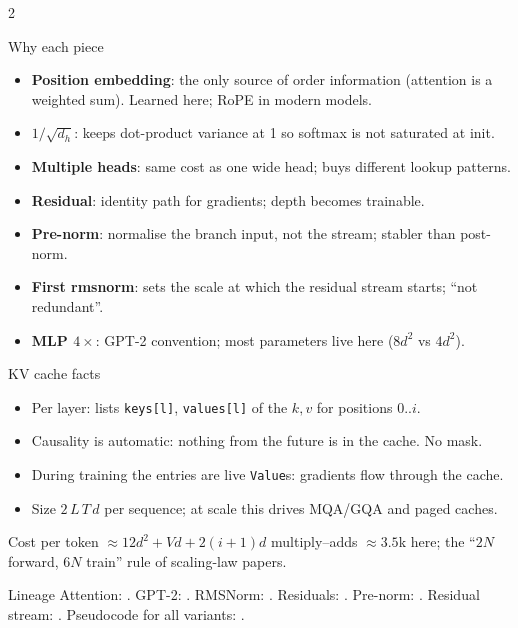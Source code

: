 \documentclass[10pt,letterpaper]{article}
\newcommand{\code}[1]{\lstinline[basicstyle=\ttfamily\small]|#1|}
\newcounter{q}
\begin{document}
\begin{multicols}{2}
\columnbreak

\begin{csb}{Why each piece}
\begin{itemize}
  \item \textbf{Position embedding}: the only source of order information (attention is a weighted sum). Learned here; RoPE in modern models.
  \item \textbf{$1/\sqrt{d_h}$}: keeps dot-product variance at 1 so softmax is not saturated at init.
  \item \textbf{Multiple heads}: same cost as one wide head; buys different lookup patterns.
  \item \textbf{Residual}: identity path for gradients; depth becomes trainable.
  \item \textbf{Pre-norm}: normalise the branch input, not the stream; stabler than post-norm.
  \item \textbf{First rmsnorm}: sets the scale at which the residual stream starts; ``not redundant''.
  \item \textbf{MLP $4\times$}: GPT-2 convention; most parameters live here ($8d^2$ vs $4d^2$).
\end{itemize}
\end{csb}

\begin{csb}{KV cache facts}
\begin{itemize}
  \item Per layer: lists \code{keys[l]}, \code{values[l]} of the $k,v$ for positions $0..i$.
  \item Causality is automatic: nothing from the future is in the cache. No mask.
  \item During training the entries are live \code{Value}s: gradients flow through the cache.
  \item Size $2\,L\,T\,d$ per sequence; at scale this drives MQA/GQA and paged caches.
\end{itemize}
\end{csb}

\begin{csb}{Cost per token}
$\approx 12d^2 + Vd + 2(i{+}1)d$ multiply--adds $\approx 3.5$k here; the ``$2N$ forward, $6N$ train'' rule of scaling-law papers.
\end{csb}

\begin{csb}{Lineage}
Attention: \textcite{bahdanau2015attention,vaswani2017attention}. GPT-2: \textcite{radford2019gpt2}. RMSNorm: \textcite{zhang2019rmsnorm}. Residuals: \textcite{he2016resnet}. Pre-norm: \textcite{xiong2020prelayernorm}. Residual stream: \textcite{elhage2021mathematical}. Pseudocode for all variants: \textcite{phuong2022formal}.
\end{csb}
\end{multicols}
\end{document}
